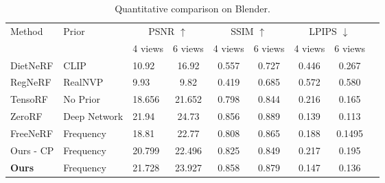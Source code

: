 \begin{table*}[t]
	\centering
    \vspace{-1.5em}
	\caption{Quantitative comparison on Blender.}
	\label{tab:blender_comparison}
	\begin{tabular}{l l lcccccc}
		\toprule
		\multirow{2}{*}{Method} & \multirow{2}{*}{Prior} & \multicolumn{2}{c}{PSNR $\uparrow$} & \multicolumn{2}{c}{SSIM $\uparrow$} & \multicolumn{2}{c}{LPIPS $\downarrow$} \\
		\cmidrule(lr){3-4} \cmidrule(lr){5-6} \cmidrule(lr){7-8}
		& & 4 views & 6 views & 4 views & 6 views & 4 views & 6 views \\
		\midrule
		DietNeRF \cite{jain2021putting} & CLIP & 10.92 & 16.92 & 0.557 & 0.727 & 0.446 & 0.267 \\
		RegNeRF \cite{jain2021putting} & RealNVP & 9.93 & 9.82 & 0.419 & 0.685 & 0.572 & 0.580 \\
		\midrule
		TensoRF \cite{Chen2022ECCV}& No Prior & 18.656 & 21.652 & 0.798 & 0.844 & 0.216 & 0.165  \\
		\midrule
		ZeroRF \cite{shi2024zerorf}& Deep Network & \cellcolor{red!25} 21.94 & \cellcolor{red!25}24.73 & \cellcolor{orange!25} 0.856 & \cellcolor{red!25}0.889 & \cellcolor{red!25}0.139 & \cellcolor{red!25} 0.113 \\
		FreeNeRF \cite{yang2023freenerf} & Frequency & 18.81 & \cellcolor{yellow!25} 22.77 & \cellcolor{yellow!25} 0.808 & 0.865 & \cellcolor{yellow!25} 0.188 &   \cellcolor{yellow!25}0.1495 \\
		\midrule
		Ours - CP & Frequency & \cellcolor{yellow!25} 20.799 & 22.496 & \cellcolor{yellow!25}0.825 & \cellcolor{yellow!25}0.849 & 0.217 &  0.195  \\
		\textbf{Ours} & Frequency & \cellcolor{orange!25} 21.728 & \cellcolor{orange!25} 23.927 & \cellcolor{red!25} 0.858 & \cellcolor{orange!25}0.879 & \cellcolor{orange!25} 0.147 & \cellcolor{orange!25} 0.136  \\
		\bottomrule
	\end{tabular}
	\label{tab:blender-results}
\end{table*}


